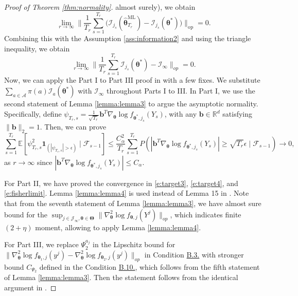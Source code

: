 \documentclass[12pt]{article}
\newcommand{\bfTheta}{\boldsymbol{\Theta}}
\newcommand{\bftheta}{\boldsymbol{\theta}}
\begin{document}
\begin{proof}[Proof of Theorem \ref{thm:normality}]
almost surely), we obtain
\begin{equation*}
\lim_{r \to \infty}
\Big\|
\frac{1}{T_r} \sum_{s=1}^{T_r}
\bigl(
  \mathcal{I}_{j_s}(\hat{\bftheta}_{T_r}^{\mathrm{ML}})
  - \mathcal{I}_{j_s}(\bftheta^{\ast})
\bigr)
\Big\|_{\mathrm{op}}
= 0.
\end{equation*}
Combining this with the Assumption \ref{ass:information2} and using the triangle inequality, we obtain
\begin{equation} \label{e:fisherlimit}
\lim_{r \to \infty} \Big \| \frac{1}{T_r}\sum_{s=1}^{T_r}
\mathcal{I}_{j_s}(\bftheta^{\ast}) - \mathcal{I}_{\infty} \Big \|_{op} = 0. 
\end{equation}
Now, we can apply the Part I to Part III proof in  with a few fixes. We substitute $\sum_{a \in \mathcal{A}} \pi(a) \mathcal{I}_a(\bftheta^{\ast})$ with $\mathcal{I}_{\infty}$ throughout Parts I to III. In Part I, we use the second statement of Lemma \ref{lemma:lemma3} to argue the asymptotic normality. Specifically, define $\psi_{T_r,s} = \frac{1}{\sqrt{T_r}} \mathbf{b}^T \nabla_{\bftheta} \log f_{\bftheta^{\ast},j_s}(Y_s)$, with any $\mathbf{b} \in \mathbb{R}^d$ satisfying $\|\mathbf{b}\|_2 = 1$. Then, we can prove 
\begin{equation*}
\sum_{s=1}^{T_r} \mathbb{E}[ \psi_{T_r, s}^2 \mathbf{1}_{(| \psi_{T_r,s}| > \epsilon)} \mid \mathcal{F}_{s-1} ] 
\le \frac{C_{\alpha}^2}{T_r} \sum_{s=1}^{T_r} P( |\mathbf{b}^T \nabla_{\bftheta} \log f_{\bftheta^{\ast}, j_s}(Y_s)| \ge \sqrt{T_r} \epsilon \mid \mathcal{F}_{s-1}) 
\to 0,
\end{equation*}
as $r \to \infty$ since $|\mathbf{b}^T \nabla_{\bftheta} \log f_{\bftheta^{\ast}, j_s}(Y_s)| \leq C_{\alpha}$. 

For Part II, we have proved the convergence in \eqref{e:target3}, \eqref{e:target4}, and \eqref{e:fisherlimit}. Lemma \ref{lemma:lemma4} is used instead of Lemma 15 in . Note that from the seventh statement of Lemma \ref{lemma:lemma3}, we have almost sure bound for the $\sup_{j \in \mathcal{J}_{\infty}, \bftheta \in \bfTheta} \| \nabla_{\bftheta}^2 \log f_{\bftheta, j}(Y^j) \|_{op}$, which indicates finite $(2+\eta)$ moment, allowing to apply Lemma \ref{lemma:lemma4}.   

For Part III, we replace $\Psi_2^{a_j}$ in the Lipschitz bound for $\|\nabla_{\bftheta}^2 \log f_{\bftheta_1, j}(y^j) - \nabla_{\bftheta}^2 \log f_{\bftheta_2, j}(y^j)\|_{op}$ in Condition \hyperref[c:c3]{B.3.} with stronger bound $C_{\Psi_2}$ defined in the Condition \hyperref[c:c2']{B.10.}, which follows from the fifth statement of Lemma \ref{lemma:lemma3}. Then the statement follows from the identical argument in . 




\end{proof}
\end{document}
